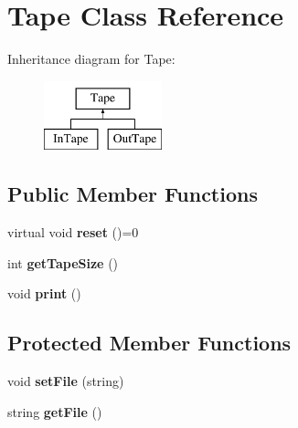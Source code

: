 \hypertarget{classTape}{\section{Tape Class Reference}
\label{classTape}
}
Inheritance diagram for Tape\-:\begin{figure}[H]
\begin{center}
\leavevmode
\includegraphics[height=2.000000cm]{classTape}
\end{center}
\end{figure}
\subsection*{Public Member Functions}
\begin{DoxyCompactItemize}
\item 
\hypertarget{classTape_a5f06dea26c7e30c323613f52b5edea62}{virtual void {\bfseries reset} ()=0}\label{classTape_a5f06dea26c7e30c323613f52b5edea62}

\item 
\hypertarget{classTape_a90be518f537d4210cee05b716feede36}{int {\bfseries get\-Tape\-Size} ()}\label{classTape_a90be518f537d4210cee05b716feede36}

\item 
\hypertarget{classTape_a2906a5dbf3c52729b0ae5a336c3828b6}{void {\bfseries print} ()}\label{classTape_a2906a5dbf3c52729b0ae5a336c3828b6}

\end{DoxyCompactItemize}
\subsection*{Protected Member Functions}
\begin{DoxyCompactItemize}
\item 
\hypertarget{classTape_a0a6f4c9427e679f2ff77b4c0c2792429}{void {\bfseries set\-File} (string)}\label{classTape_a0a6f4c9427e679f2ff77b4c0c2792429}

\item 
\hypertarget{classTape_ac57754a7bdde56b9509a9a992b833e97}{string {\bfseries get\-File} ()}\label{classTape_ac57754a7bdde56b9509a9a992b833e97}

\end{DoxyCompactItemize}

